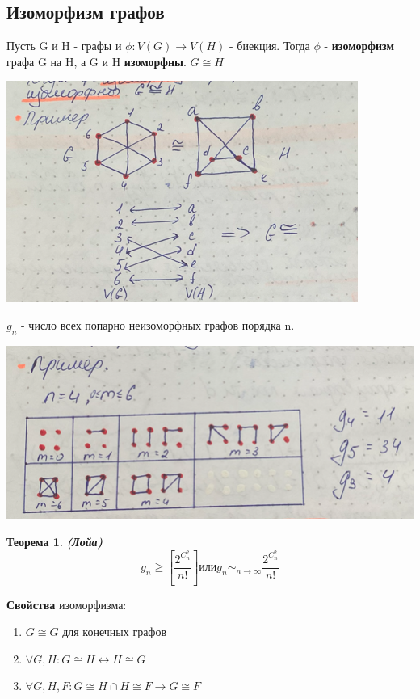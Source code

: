 \documentclass[a4paper, 12pt]{article}
\newtheorem*{theorem*}{Теорема}
\theoremstyle{definition}
\theoremstyle{definition}
\renewcommand{\geq}{\geqslant}
\begin{document}
  \subsection*{Изоморфизм графов}
  Пусть G и H - графы и $\phi:V(G)\rightarrow V(H)$  - биекция. Тогда $\phi$ - \textbf{изоморфизм} графа G на H, а G и H \textbf{изоморфны}. $G\cong H$

  \includegraphics{example_iso.png}

  $g_n$ - число всех попарно неизоморфных графов порядка n.

  \includegraphics{ex_ni.png}

  \begin{theorem*}
    \textbf{(Лойа)}
    $$g_n\geq[\frac{2^{C^2_n}}{n!}] \text{или}g_n\sim_{n\rightarrow\infty}\frac{2^{C^2_n}}{n!}$$
  \end{theorem*}

  \textbf{Свойства} изоморфизма:
  \begin{enumerate}
    \item $G\cong G$ для конечных графов
    \item $\forall G,H:G\cong H\leftrightarrow H\cong G$
    \item $\forall G,H,F: G\cong H\cap H\cong F\rightarrow G\cong F$
  \end{enumerate}
\end{document}
